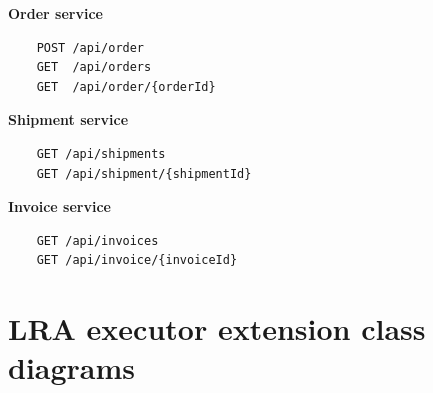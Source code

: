 \documentclass[oneside,
  digital, %
  table,   %
  nolof,     %
  nolot,     %
]{fithesis3}
\begin{document}
\textbf{Order service}

\begin{verbatim}
    POST /api/order
    GET  /api/orders
    GET  /api/order/{orderId}
\end{verbatim}

\noindent
\textbf{Shipment service}

\begin{verbatim}
    GET /api/shipments
    GET /api/shipment/{shipmentId}
\end{verbatim}

\noindent
\textbf{Invoice service}

\begin{verbatim}
    GET /api/invoices
    GET /api/invoice/{invoiceId}
\end{verbatim}


\clearpage
\chapter{LRA executor extension class diagrams}
\label{sec:appendix-class-diagrams}
\end{document}
